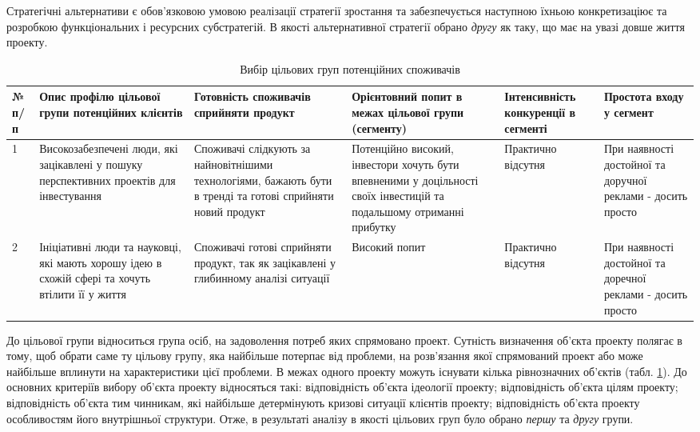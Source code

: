 Стратегічні альтернативи є обов'язковою умовою реалізації стратегії зростання та забезпечується наступною їхньою конкретизаціює та розробкою функціональних і ресурсних субстратегій. В якості альтернативної стратегії обрано \textit{другу} як таку, що має на увазі довше життя проекту.

\begin{table}[h!]
\fontsize{12pt}{12pt}\selectfont
	\begin{tabularx}{\textwidth}{|l|X|X|X|X|X|}
    \hline
    № п/п & Опис профілю цільової групи потенційних клієнтів & Готовність споживачів сприйняти продукт & Орієнтовний попит в межах цільової групи (сегменту) & Інтенсивність конкуренції в сегменті & Простота входу у сегмент \\ \hline
    1 & Високозабезпечені люди, які зацікавлені у пошуку перспективних проектів для інвестування & Споживачі слідкують за найновітнішими технологіями, бажають бути в тренді та готові сприйняти новий продукт & Потенційно високий, інвестори хочуть бути впевненими у доцільності своїх інвестицій та подальшому отриманні прибутку & Практично відсутня & При наявності достойної та доручної реклами - досить просто \\ \hline
    2 & Ініціативні люди та науковці, які мають хорошу ідею в схожій сфері та хочуть втілити її у життя & Споживачі готові сприйняти продукт, так як зацікавлені у глибинному аналізі ситуації & Високий попит & Практично відсутня & При наявності достойної та доречної реклами - досить просто \\
    \hline
    \end{tabularx}
\caption{Вибір цільових груп потенційних споживачів} \label{tab:stab_10}
\end{table}

До цільової групи відноситься група осіб, на задоволення потреб яких спрямовано проект. Сутність визначення об'єкта проекту полягає в тому, щоб обрати саме ту цільову групу, яка найбільше потерпає від проблеми, на розв'язання якої спрямований проект або може найбільше вплинути на характеристики цієї проблеми. В межах одного проекту можуть існувати кілька рівнозначних об'єктів (табл. \ref{tab:stab_10}). До основних критеріїв вибору об'єкта проекту відносяться такі: відповідність об'єкта ідеології проекту; відповідність об'єкта цілям проекту; відповідність об'єкта тим чинникам, які найбільше детермінують кризові ситуації клієнтів проекту; відповідність об'єкта проекту особливостям його внутрішньої структури. Отже, в результаті аналізу в якості цільових груп було обрано \textit{першу} та \textit{другу} групи.


